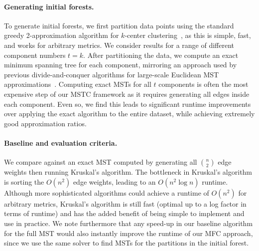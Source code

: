 \paragraph{Generating initial forests.}
To generate initial forests, we first partition data points using the standard greedy 2-approximation algorithm for $k$-center clustering~\cite{gonzalez1985clustering}, as this is simple, fast, and works for arbitrary metrics. We consider results for a range of different 
 component numbers $t = k$.
After partitioning the data, we compute an exact minimum spanning tree for each component, mirroring an approach used by previous divide-and-conquer algorithms for large-scale Euclidean MST approximations~\cite{jothi2018fast,zhong2015fast,mishra2020efficient}. Computing exact MSTs for all $t$ components is often the most expensive step of our MSTC framework as it requires generating all edges inside each component. Even so, we find this leads to significant runtime improvements over applying the exact algorithm to the entire dataset, while achieving extremely good approximation ratios. 

\paragraph{Baseline and evaluation criteria.}
We compare against an exact MST computed by generating all ${n \choose 2}$ edge weights then running Kruskal's algorithm. The bottleneck in Kruskal's algorithm is sorting the $O(n^2)$ edge weights, leading to an $O(n^2 \log n)$ runtime. Although more sophisticated algorithms could achieve a runtime of $O(n^2)$ for arbitrary metrics, Kruskal's algorithm is still fast (optimal up to a log factor in terms of runtime) and has the added benefit of being simple to implement and use in practice. We note furthermore that any speed-up in our baseline algorithm for the full MST would also instantly improve the runtime of our MFC approach, since we use the same solver to find MSTs for the partitions in the initial forest. 

